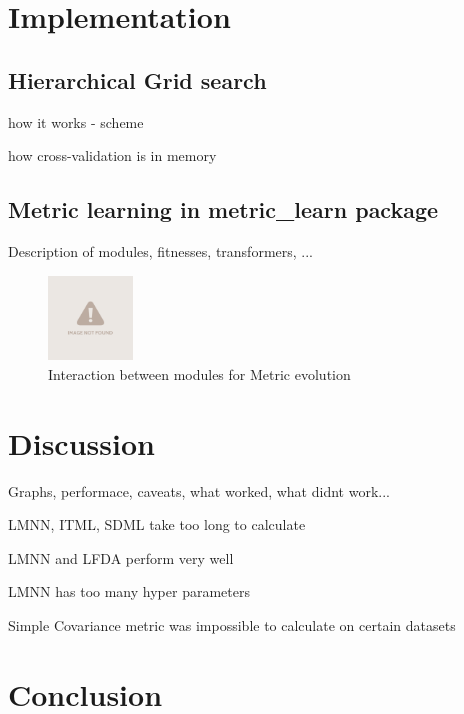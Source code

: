 \documentclass[12pt,a4paper]{report}
\begin{document}

\chapter{Implementation} \label{chap:impl}

\section{Hierarchical Grid search}

how it works - scheme

how cross-validation is in memory

\section{Metric learning in metric\_learn package}

Description of modules, fitnesses, transformers, ...

\begin{figure}[h!] \label{fig:implementation-modules}
	\centering
    \includegraphics[width=0.2\textwidth]{img/notfound}
    \caption{Interaction between modules for Metric evolution}
\end{figure}


\chapter{Discussion}

Graphs, performace, caveats, what worked, what didnt work...

LMNN, ITML, SDML take too long to calculate

LMNN and LFDA perform very well

LMNN has too many hyper parameters

Simple Covariance metric was impossible to calculate on certain datasets


\chapter*{Conclusion}
\end{document}
